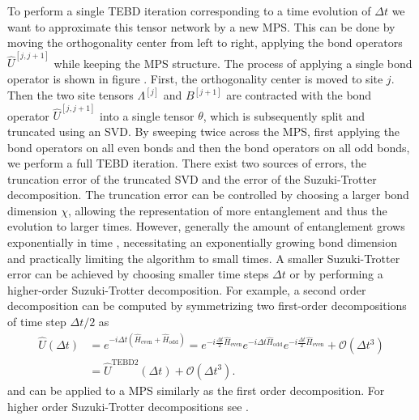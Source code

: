 To perform a single TEBD iteration corresponding to a time evolution of $\Delta t$ we want to approximate this tensor network by a new MPS. This can be done by moving the orthogonality center from left to right, applying the bond operators $\hat{U}^{[j, j+1]}$ while keeping the MPS structure. The process of applying a single bond operator is shown in figure . First, the orthogonality center is moved to site $j$. Then the two site tensors $\Lambda^{[j]}$ and $B^{[j+1]}$ are contracted with the bond operator $\hat{U}^{[j, j+1]}$ into a single tensor $\theta$, which is subsequently split and truncated using an SVD. By sweeping twice across the MPS, first applying the bond operators on all even bonds and then the bond operators on all odd bonds, we perform a full TEBD iteration. There exist two sources of errors, the truncation error of the truncated SVD and the error of the Suzuki-Trotter decomposition. The truncation error can be controlled by choosing a larger bond dimension $\chi$, allowing the representation of more entanglement and thus the evolution to larger times. However, generally the amount of entanglement grows exponentially in time \cite{cite:DMRG_in_the_age_of_MPS}, necessitating an exponentially growing bond dimension and practically limiting the algorithm to small times. A smaller Suzuki-Trotter error can be achieved by choosing smaller time steps $\Delta t$ or by performing a higher-order Suzuki-Trotter decomposition. For example, a second order decomposition can be computed by symmetrizing two first-order decompositions of time step $\Delta t /2$ as
\begin{equation}
	\begin{split}
		\hat{U}(\Delta t) &= e^{-i\Delta t\left(\hat{H}_\text{even} + \hat{H}_\text{odd}\right)} = e^{-i\frac{\Delta t}{2}\hat{H}_\text{even}} e^{-i\Delta t \hat{H}_\text{odd}} e^{-i\frac{\Delta t}{2}\hat{H}_\text{even}} + \mathcal{O}\left(\Delta t^3\right)\\
		&= \hat{U}^\text{TEBD2}(\Delta t) + \mathcal{O}\left(\Delta t^3\right).
	\end{split}
\end{equation}
and can be applied to a MPS similarly as the first order decomposition. For higher order Suzuki-Trotter decompositions see \cite{cite:finding_exponential_product_formulas_of_higher_orders}.
